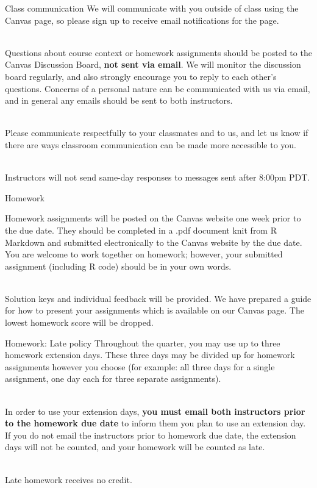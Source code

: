 \documentclass[10pt,t]{beamer}
\begin{document}
\begin{frame}{Class communication}
We will communicate with you outside of class using the Canvas page, so please sign up to receive email notifications for the page. \\~\

Questions about course context or homework assignments should be posted to the Canvas Discussion Board, \textbf{not sent via email}. We will monitor the discussion board regularly, and also strongly encourage you to reply to each other’s questions. Concerns of a personal nature can be communicated with us via email, and in general any emails should be sent to both instructors. \\~\

Please communicate respectfully to your classmates and to us, and let us know if there are ways classroom communication can be made more accessible to you. \\~\

Instructors will not send same-day responses to messages sent after 8:00pm PDT.
\end{frame}

\begin{frame}{Homework}

Homework assignments will be posted on the Canvas website one week 
prior to the due date. They should be completed in a .pdf document knit from R 
Markdown and submitted electronically to the Canvas website by the due date. You are 
welcome to work together on homework; however, your submitted assignment 
(including R code) should be in your own words. \\~\

Solution keys and individual feedback 
will be provided. We have prepared a guide for how to present your assignments which 
is available on our Canvas page. The lowest homework score will be dropped.

\end{frame}

\begin{frame}{Homework: Late policy}
Throughout the quarter, you may use up to three homework 
extension days. These three days may be divided up for homework assignments however you choose (for example: all three days for a single assignment, one day each for three separate assignments). \\~\

In order to use your extension days, \textbf{you must email both instructors prior to the homework due date} to inform them you plan to use an extension day. If you do not email the instructors prior to homework due date, the extension days will not be counted, and your homework will be counted as late. \\~\

Late homework receives no credit.

\end{frame}
\end{document}
